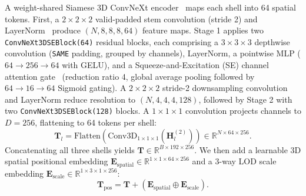 \documentclass[runningheads]{llncs}
\begin{document}
A weight-shared Siamese 3D ConvNeXt encoder~\cite{liu2022convnet} maps each shell into 64 spatial tokens. First, a $2\times2\times2$ valid-padded stem convolution (stride 2) and LayerNorm~\cite{ba2016layernorm} produce $(N, 8, 8, 8, 64)$ feature maps. Stage 1 applies two \texttt{ConvNeXt3DSEBlock(64)} residual blocks, each comprising a $3\times3\times3$ depthwise convolution (\texttt{SAME} padding, grouped by channels), LayerNorm, a pointwise MLP ($64 \to 256 \to 64$ with GELU), and a Squeeze-and-Excitation (SE) channel attention gate~\cite{hu2018squeeze} (reduction ratio 4, global average pooling followed by $64 \to 16 \to 64$ Sigmoid gating). A $2\times2\times2$ stride-2 downsampling convolution and LayerNorm reduce resolution to $(N, 4, 4, 4, 128)$, followed by Stage 2 with two \texttt{ConvNeXt3DSEBlock(128)} blocks. A $1\times1\times1$ convolution projects channels to $D = 256$, flattening to 64 tokens per shell:
\begin{equation}
\mathbf{T}_l = \mathrm{Flatten}\left(\mathrm{Conv3D}_{1\times1\times1}\left(\mathbf{H}_l^{(2)}\right)\right) \in \mathbb{R}^{N \times 64 \times 256}.
\end{equation}
Concatenating all three shells yields $\mathbf{T} \in \mathbb{R}^{B \times 192 \times 256}$. We then add a learnable 3D spatial positional embedding $\mathbf{E}_{\text{spatial}} \in \mathbb{R}^{1 \times 1 \times 64 \times 256}$ and a 3-way LOD scale embedding $\mathbf{E}_{\text{scale}} \in \mathbb{R}^{1 \times 3 \times 1 \times 256}$:
\begin{equation}
\mathbf{T}_{\text{pos}} = \mathbf{T} + \left(\mathbf{E}_{\text{spatial}} \oplus \mathbf{E}_{\text{scale}}\right).
\end{equation}
\end{document}
